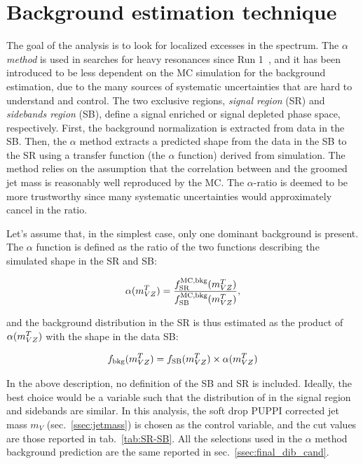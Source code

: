 \section{Background estimation technique}
\label{sec:alpha}

The goal of the analysis is to look for localized excesses in the \mtVZ spectrum. The \emph{$\alpha$ method} is used in searches for heavy resonances since Run 1~\cite{Khachatryan:2015cwa}, and it has been introduced to be less dependent on the MC simulation for the background \mtVZ estimation, due to the many sources of systematic uncertainties that are hard to understand and control. The two exclusive regions, \emph{signal region} (SR) and \emph{sidebands region} (SB), define a signal enriched or signal depleted phase space, respectively. First, the background normalization is extracted from data in the SB. Then, the $\alpha$ method extracts a predicted shape from the data in the SB to the SR using a transfer function (the $\alpha$ function) derived from simulation. The method relies on the assumption that the correlation between \mtVZ and the groomed jet mass is reasonably well reproduced by the MC. The $\alpha$-ratio is deemed to be more trustworthy since many systematic uncertainties would approximately cancel in the ratio.

\noindent Let's assume that, in the simplest case, only one dominant background is present. The $\alpha$ function is defined as the ratio of the two functions describing the simulated \mtVZ shape in the SR and SB:

\begin{equation}
\alpha(m_{VZ}^T) = \frac{f_{\text{SR}}^{\text{MC,bkg}}(m_{VZ}^T)}{f_{\text{SB}}^{\text{MC,bkg}}(m_{VZ}^T)},
\end{equation}

\noindent and the background distribution in the SR is thus estimated as the product of  $\alpha(m_{VZ}^T)$ with the shape in the data SB:

\begin{equation}
f_{\text{bkg}}(m_{VZ}^T) = f_{\text{SB}}(m_{VZ}^T) \times \alpha(m_{VZ}^T)
\end{equation}

\noindent In the above description, no definition of the SB and SR is included. Ideally, the best choice would be a variable such that the distribution of \mtVZ in the signal region and sidebands are similar. In this analysis, the soft drop PUPPI corrected jet mass $m_V$ (sec.~\ref{ssec:jetmass}) is chosen as the control variable, and the cut values are those reported in tab.~\ref{tab:SR-SB}. All the selections used in the $\alpha$ method background prediction are the same reported in sec.~\ref{ssec:final_dib_cand}.

